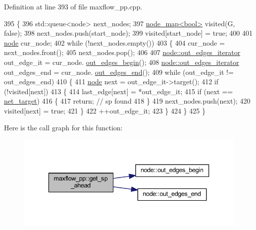 Definition at line 393 of file maxflow\+\_\+pp.\+cpp.


\begin{DoxyCode}
395 \{
396     std::queue<node> next\_nodes;
397     \mbox{\hyperlink{classnode__map}{node\_map<bool>}} visited(G, \textcolor{keyword}{false});
398     next\_nodes.push(start\_node);
399     visited[start\_node] = \textcolor{keyword}{true};
400 
401     \mbox{\hyperlink{classnode}{node}} cur\_node;
402     \textcolor{keywordflow}{while} (!next\_nodes.empty())
403     \{
404     cur\_node = next\_nodes.front();
405     next\_nodes.pop();
406         
407     \mbox{\hyperlink{classnode_a90e17ed34de55072e8077f4367499a98}{node::out\_edges\_iterator}} out\_edge\_it = cur\_node.
      \mbox{\hyperlink{classnode_a7dcb80df22118cea04f77ca8c952d9c2}{out\_edges\_begin}}();
408     \mbox{\hyperlink{classnode_a90e17ed34de55072e8077f4367499a98}{node::out\_edges\_iterator}} out\_edges\_end = cur\_node.
      \mbox{\hyperlink{classnode_a7ce2ba5195a63d4df6b44299a02a9378}{out\_edges\_end}}();
409     \textcolor{keywordflow}{while} (out\_edge\_it != out\_edges\_end)
410     \{
411         \mbox{\hyperlink{classnode}{node}} next = out\_edge\_it->target();
412         \textcolor{keywordflow}{if} (!visited[next])
413         \{
414         last\_edge[next] = *out\_edge\_it;
415         \textcolor{keywordflow}{if} (next == \mbox{\hyperlink{classmaxflow__pp_a10f0b047011e04cb4816a824da5b7892}{net\_target}})
416         \{
417             \textcolor{keywordflow}{return}; \textcolor{comment}{// sp found}
418         \}
419         next\_nodes.push(next);
420         visited[next] = \textcolor{keyword}{true};
421         \}
422         ++out\_edge\_it;
423     \}
424     \}
425 \}
\end{DoxyCode}
Here is the call graph for this function\+:\nopagebreak
\begin{figure}[H]
\begin{center}
\leavevmode
\includegraphics[width=336pt]{classmaxflow__pp_a340e4b9909a44ed7003760017c761e3b_cgraph}
\end{center}
\end{figure}
